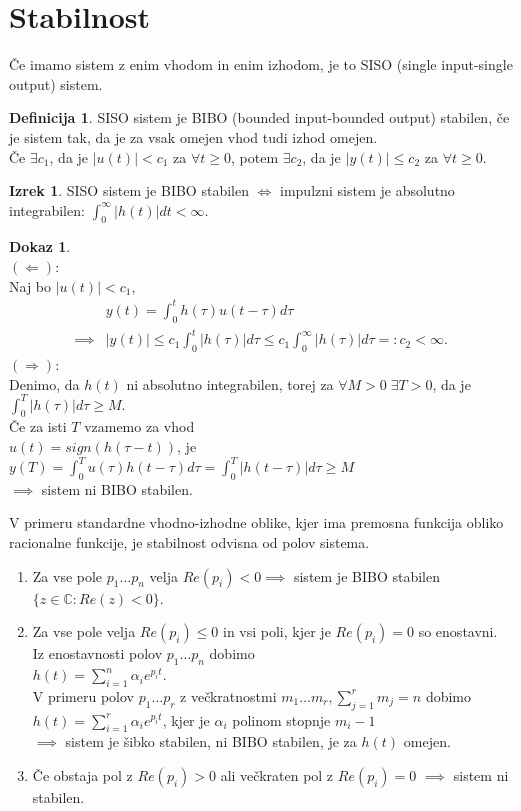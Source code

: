 \documentclass[a4paper, 12pt]{book}
\theoremstyle{definition}
\newtheorem{defn}[counter]{Definicija}
\newtheorem{theorem}[counter]{Izrek}
\newtheorem{pro}[counter]{Dokaz}
\theoremstyle{remark}
\newcommand{\C}{\mathbb{C}}
\begin{document}
\section{Stabilnost}

Če imamo sistem z enim vhodom in enim izhodom, je to SISO (single input-single output) sistem.
\begin{defn}
  SISO sistem je BIBO (bounded input-bounded output) stabilen,
  če je sistem tak, da je za vsak omejen vhod tudi izhod omejen. \\
  Če $\exists c_1$, da je $|u(t)| < c_1$ za $\forall t \geq 0$, potem $\exists c_2$,
  da je $|y(t)| \leq c_2$ za $\forall t \geq 0$.
\end{defn}
\begin{theorem}
  SISO sistem je BIBO stabilen $\iff$ impulzni sistem je absolutno integrabilen:
  $\int_0^{\infty} |h(t)| dt < \infty$.
\end{theorem}
\begin{pro} \text{} \\
  $(\Leftarrow)$: \\
  Naj bo $|u(t)| < c_1$,
  \begin{align*}
      &y(t) = \int_0^t h(\tau) u(t-\tau) d\tau \\
      \implies &|y(t)| \leq c_1 \int_0^t |h(\tau)| d\tau
      \leq c_1 \int_0^{\infty} |h(\tau)| d\tau =: c_2 < \infty.
  \end{align*}
  $(\Rightarrow)$: \\
  Denimo, da $h(t)$ ni absolutno integrabilen, torej za $\forall M > 0 \; \exists T > 0$,
  da je $\int_0^T |h(\tau)| d\tau \geq M$. \\
  Če za isti $T$ vzamemo za vhod \\
  $u(t) = sign(h(\tau-t))$, je \\
  $y(T) = \int_0^T u(\tau) h(t-\tau) d\tau = \int_0^T |h(t-\tau)| d\tau \geq M$ \\
  $\implies$ sistem ni BIBO stabilen.
\end{pro}
V primeru standardne vhodno-izhodne oblike, kjer ima premosna funkcija obliko racionalne funkcije,
je stabilnost odvisna od polov sistema.
\begin{enumerate}[label=\alph*)]
  \item Za vse pole $p_1 \dots p_n$ velja $Re(p_i) < 0 \implies$ sistem je BIBO stabilen \\
      $\{z \in \C: Re(z) < 0\}$.
  \item Za vse pole velja $Re(p_i) \leq 0$ in vsi poli, kjer je $Re(p_i) = 0$ so enostavni. \\
      Iz enostavnosti polov $p_1 \dots p_n$ dobimo \\
      $h(t) = \sum_{i=1}^n \alpha_i e^{p_i t}$. \\
      V primeru polov $p_1 \dots p_r$ z večkratnostmi $m_1 \dots m_r, \sum_{j=1}^r m_j = n$
      dobimo $h(t) = \sum_{i=1}^r \alpha_i e^{p_i t}$,
      kjer je $\alpha_i$ polinom stopnje $m_i-1$ \\
      $\implies$ sistem je šibko stabilen, ni BIBO stabilen, je za $h(t)$ omejen.
  \item Če obstaja pol z $Re(p_i) > 0$ ali večkraten pol z $Re(p_i) = 0$
      $\implies$ sistem ni stabilen.
\end{enumerate}
\end{document}
